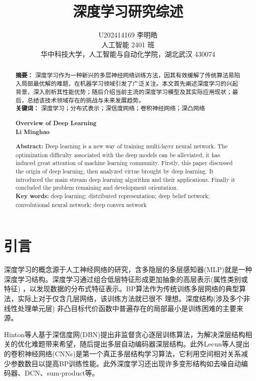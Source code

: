 \documentclass[UTF8]{article}
\title{\textbf{深度学习研究综述}} %
\author{{U202414169 李明皓}\\
{\small 人工智能 2401 班}\\
\small 华中科技大学，人工智能与自动化学院，湖北武汉 430074}
\date{}
\begin{document}
	\maketitle
	\renewcommand{\abstractname}{}
	\begin{abstract}
		\noindent
		\textbf{摘要：}
深度学习作为一种新兴的多层神经网络训练方法，因其有效缓解了传统算法易陷入局部最优解的难题，在机器学习领域引发了广泛关注。本文首先阐述深度学习的兴起背景，深入剖析其性能优势；随后介绍当前主流的深度学习模型及其实际应用现状；最后，总结该技术领域存在的挑战与未来发展趋势。\\
		\noindent
		\textbf{关键词：} 深度学习；分布式表示；深信度网络；卷积神经网络；深凸网络 %
	\end{abstract}
	
	\renewcommand{\abstractname}{}
		\begin{abstract}
			\begin{center}
			\textbf{Overview of Deep Learning} \\[0.5em]
			\textbf{Li Minghao} \\[1em]
			\end{center}
		\noindent
		\textbf{Abstract:} 
	  	Deep learning is a new way of training multi-layer neural network. The optimization difficulty associated with the deep models can be alleviated, it has induced great attention of machine learning community. Firstly, this paper discussed the origin of deep learning, then analyzed virtue brought by deep learning. It introduced the main stream deep learning algorithm and their applications. Finally it concluded the problem remaining and development orientation.\\[1em]
		\noindent
		\textbf{Key words:} deep learning; distributed representation; deep belief network; convolutional neural network; deep convex network
	\end{abstract}
	\clearpage
	\section{引言}
	深度学习的概念源于人工神经网络的研究，含多隐层的多层感知器(MLP)就是一种深度学习结构。深度学习通过组合低层特征形成更加抽象的高层表示(属性类别或特征) ，以发现数据的分布式特征表示\cite{v1}。BP算法作为传统训练多层网络的典型算法，实际上对于仅含几层网络，该训练方法就已很不
	理想\cite{v2}。深度结构(涉及多个非线性处理单元层) 非凸目标代价函数中普遍存在的局部最小是训练困难的主要来源。
	
	Hinton\cite{v3,v4,v5}等人基于深信度网(DBN)提出非监督贪心逐层训练算法，为解决深层结构相关的优化难题带来希望，随后提出多层自动编码器深层结构。此外Lecun等人提出的卷积神经网络(CNNs)是第一个真正多层结构学习算法\cite{v6}，它利用空间相对关系减少参数数目以提高BP训练性能。此外深度学习还出现许多变形结构如去噪自动编码器\cite{v7}、DCN\cite{v8}、sum-product\cite{v9}等。
	
\end{document}
